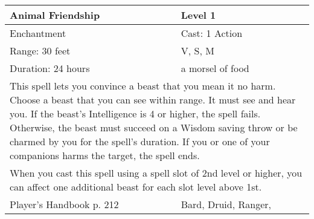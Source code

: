 \documentclass[11pt]{report}
\begin{document}
\begin{table}[H]
	\begin{tabular}{||p{6cm}|p{6cm}||}
		\hline\hline
		\bf{Animal Friendship} & Level 1\\ \hline
		Enchantment & Cast: 1 Action\\ \hline
		Range: 30 feet & V, S, M\\ \hline
		Duration: 24 hours & a morsel of food\\ \hline
		\multicolumn{2}{||p{12cm}||}{This spell lets you convince a beast that you mean it no harm.
Choose a beast that you can see within range. It must see and hear you. If the beast’s Intelligence is 4 or higher, the spell fails. Otherwise, the beast must succeed on a Wisdom saving throw or be charmed by you for the spell’s duration. If you or one of your companions harms the target, the spell ends.}\\ \hline
		\multicolumn{2}{||p{12cm}||}{When you cast this spell using a spell slot of 2nd level or higher, you can affect one additional beast for each slot level above 1st.}\\ \hline
Player's Handbook p. 212 & Bard, Druid, Ranger, \\ \hline\hline
	\end{tabular}
\end{table}
\end{document}
